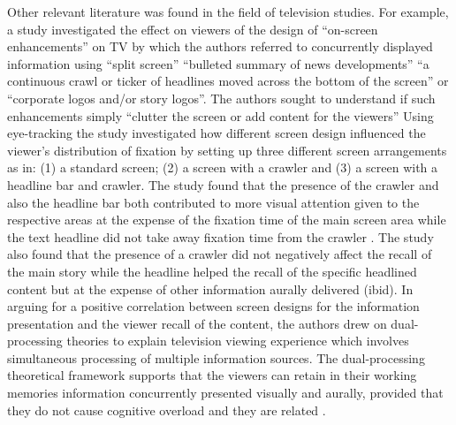 \documentclass[output=paper]{langsci/langscibook}
\begin{document}
Other relevant literature was found in the field of television studies. For example, a study \citep{josephson2006} investigated the effect on viewers of  the design of ``on-screen enhancements'' on TV by which the authors referred to concurrently displayed information using ``split screen'' ``bulleted summary of news developments'' ``a continuous crawl or ticker of headlines moved across the bottom of the screen'' or ``corporate logos and/or story logos''.  The authors sought to understand if such enhancements simply ``clutter the screen or add content for the viewers'' Using eye-tracking the study investigated how different screen design influenced the viewer's distribution of fixation by setting up three different screen arrangements as in: (1) a standard screen; (2) a screen with a crawler and (3) a screen with a headline bar and crawler.  The study found that the presence of the crawler and also the headline bar both contributed to more visual attention given to the respective areas at the expense of the fixation time of the main screen area while the text headline did not take away fixation time from the crawler \citep[161]{josephson2006}. The study also found that the presence of a crawler did not negatively affect the recall of the main story while the headline helped the recall of the specific headlined content but at the expense of other information aurally delivered (ibid). In arguing for a positive correlation between screen designs for the information presentation and the viewer recall of the content, the authors drew on dual-processing theories to explain television viewing experience which involves simultaneous processing of multiple information sources. The dual-processing theoretical framework supports that the viewers can retain in their working memories information concurrently presented visually and aurally, provided that they do not cause cognitive overload and they are related \citep{Mayer1998}. 
\end{document}
